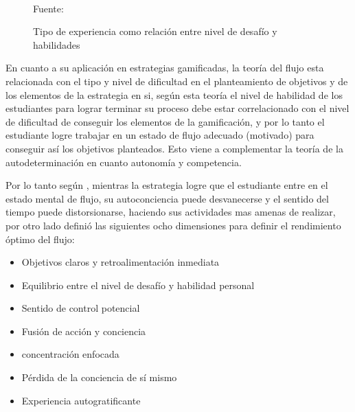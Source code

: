 \begin{figure}[ht]
\caption{Tipo de experiencia como relación entre nivel de desafío y habilidades}
\label{img:tflow}
\centering
{}
\\
{\footnotesize Fuente: }
\end{figure}

En cuanto a su aplicación en estrategias gamificadas, la teoría del flujo esta relacionada con el tipo y nivel 
de dificultad en el planteamiento de objetivos y de los elementos de la estrategia en si, según esta teoría el 
nivel de habilidad de los estudiantes para lograr terminar su proceso debe estar correlacionado con el nivel 
de dificultad de conseguir los elementos de la gamificación, y por lo tanto el estudiante logre trabajar en un 
estado de flujo adecuado (motivado) para conseguir así los objetivos planteados. Esto viene a complementar la 
teoría de la autodeterminación en cuanto autonomía y competencia.

Por lo tanto según , mientras la estrategia logre que el estudiante entre en el estado 
mental de flujo, su autoconciencia puede desvanecerse y el sentido del tiempo puede distorsionarse, haciendo 
sus actividades mas amenas de realizar, por otro lado  definió las siguientes 
ocho dimensiones para definir el rendimiento óptimo del flujo:

\begin{itemize}
	\item Objetivos claros y retroalimentación inmediata
	\item Equilibrio entre el nivel de desafío y habilidad personal
	\item Sentido de control potencial
	\item Fusión de acción y conciencia
	\item concentración enfocada
	\item Pérdida de la conciencia de sí mismo
	\item Experiencia autogratificante
\end{itemize}

